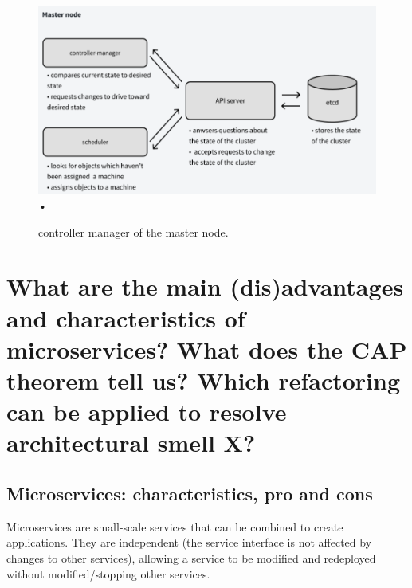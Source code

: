 \begin{itemize}
         \begin{figure}[ht]
            \centering
            \includegraphics[width=0.75\linewidth]{images/questions/controller-manager.png}•
            \caption{controller manager of the master node.}
            \label{controller-manager}
         \end{figure}
\end{itemize}


\section{What are the main (dis)advantages and characteristics of microservices? What does the CAP theorem tell us? Which refactoring can be applied to resolve architectural smell X?}

\subsection{Microservices: characteristics, pro and cons}
Microservices are small-scale services that can be combined to create applications. They are independent (the service interface is not affected by changes to other services), allowing a service to be modified and redeployed without modified/stopping other services. \nl

